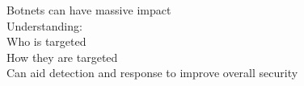 \documentclass[preview]{standalone}
\begin{document}
Botnets can have massive impact\\Understanding:\\Who is targeted\\How they are targeted\\Can aid detection and response to improve overall security\\
\end{document}
